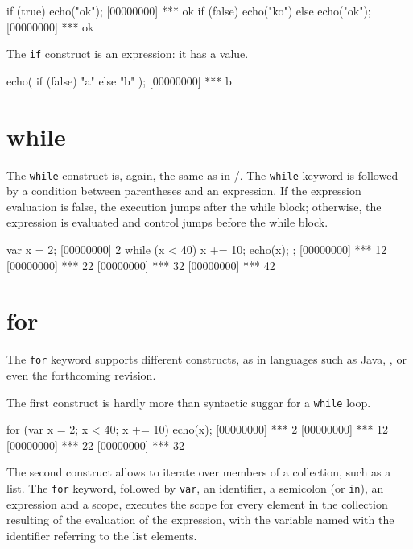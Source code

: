 \begin{urbiscript}
if (true)
  echo("ok");
[00000000] *** ok
if (false)
  echo("ko")
else
  echo("ok");
[00000000] *** ok
\end{urbiscript}

The \lstinline|if| construct is an expression: it has a value.

\begin{urbiscript}
echo({ if (false) "a" else "b" });
[00000000] *** b
\end{urbiscript}

\section{while}

The \lstinline{while} construct is, again, the same as in \C/\Cxx. The
\lstinline{while} keyword is followed by a condition between parentheses
and an expression. If the expression evaluation is false, the
execution jumps after the while block; otherwise, the expression is
evaluated and control jumps before the while block.

\begin{urbiscript}
var x = 2;
[00000000] 2
while (x < 40)
{
  x += 10;
  echo(x);
};
[00000000] *** 12
[00000000] *** 22
[00000000] *** 32
[00000000] *** 42
\end{urbiscript}

\section{for}

The \lstinline{for} keyword supports different constructs, as in
languages such as Java, \Cs, or even the forthcoming \Cxx revision.

The first construct is hardly more than syntactic suggar for a
\lstinline{while} loop.

\begin{urbiscript}
for (var x = 2; x < 40; x += 10)
  echo(x);
[00000000] *** 2
[00000000] *** 12
[00000000] *** 22
[00000000] *** 32
\end{urbiscript}

The second construct allows to iterate over members of a collection,
such as a list. The \lstinline{for} keyword, followed by
\lstinline|var|, an identifier, a semicolon (or \lstinline|in|), an
expression and a scope, executes the scope for every element in the
collection resulting of the evaluation of the expression, with the
variable named with the identifier referring to the list
elements.

